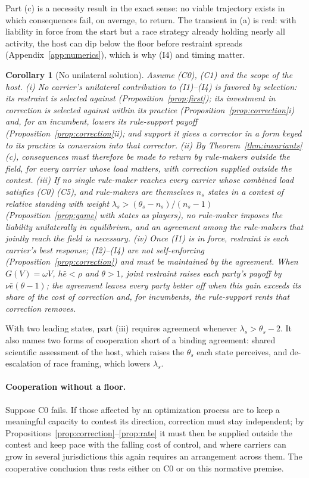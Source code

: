 \documentclass[letterpaper]{article} %
\newtheorem{corollary}{Corollary}
\theoremstyle{definition}
\begin{document}
Part (c) is a necessity result in the exact sense: no viable trajectory exists in which consequences fail, on average, to return. The transient in (a) is real: with liability in force from the start but a race strategy already holding nearly all activity, the host can dip below the floor before restraint spreads (Appendix~\ref{app:numerics}), which is why (I4) and timing matter.

\begin{corollary}[No unilateral solution]\label{cor:coop}
Assume (C0), (C1) and the scope of the host. (i) No carrier's unilateral contribution to (I1)--(I4) is favored by selection: its restraint is selected against (Proposition~\ref{prop:first}); its investment in correction is selected against within its practice (Proposition~\ref{prop:correction}i) and, for an incumbent, lowers its rule-support payoff (Proposition~\ref{prop:correction}ii); and support it gives a corrector in a form keyed to its practice is conversion into that corrector. (ii) By Theorem~\ref{thm:invariants}(c), consequences must therefore be made to return by rule-makers outside the field, for every carrier whose load matters, with correction supplied outside the contest. (iii) If no single rule-maker reaches every carrier whose combined load satisfies (C0) (C5), and rule-makers are themselves $n_s$ states in a contest of relative standing with weight $\lambda_s>(\theta_s-n_s)/(n_s-1)$ (Proposition~\ref{prop:game} with states as players), no rule-maker imposes the liability unilaterally in equilibrium, and an agreement among the rule-makers that jointly reach the field is necessary. (iv) Once (I1) is in force, restraint is each carrier's best response; (I2)--(I4) are not self-enforcing (Proposition~\ref{prop:correction}) and must be maintained by the agreement. When $G(V)=\omega V$, $h\bar e<\rho$ and $\theta>1$, joint restraint raises each party's payoff by $\nu\bar e(\theta-1)$; the agreement leaves every party better off when this gain exceeds its share of the cost of correction and, for incumbents, the rule-support rents that correction removes.
\end{corollary}

With two leading states, part (iii) requires agreement whenever $\lambda_s>\theta_s-2$. It also names two forms of cooperation short of a binding agreement: shared scientific assessment of the host, which raises the $\theta_s$ each state perceives, and de-escalation of race framing, which lowers $\lambda_s$.

\paragraph{Cooperation without a floor.} Suppose C0 fails. If those affected by an optimization process are to keep a meaningful capacity to contest its direction, correction must stay independent; by Propositions~\ref{prop:correction}--\ref{prop:rate} it must then be supplied outside the contest and keep pace with the falling cost of control, and where carriers can grow in several jurisdictions this again requires an arrangement across them. The cooperative conclusion thus rests either on C0 or on this normative premise.
\end{document}
